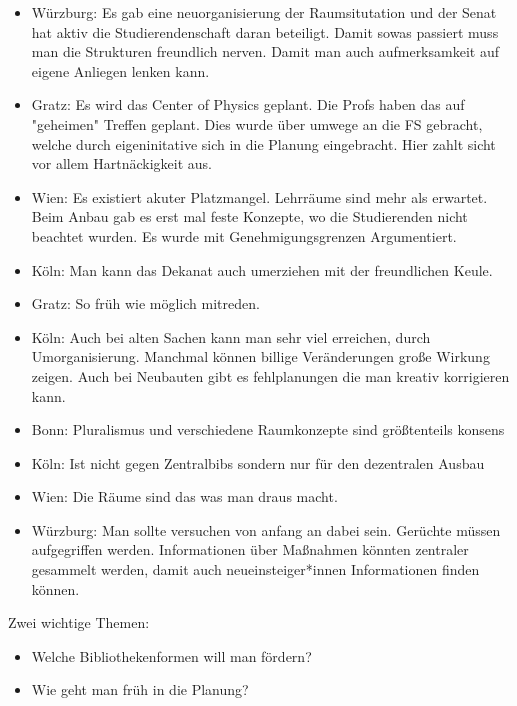 \begin{itemize}
      \item Würzburg: Es gab eine neuorganisierung der Raumsitutation und der Senat hat aktiv die Studierendenschaft daran beteiligt. Damit sowas passiert muss man die Strukturen freundlich nerven. Damit man auch aufmerksamkeit auf eigene Anliegen lenken kann.

      \item Gratz: Es wird das Center of Physics geplant. Die Profs haben das auf "geheimen" Treffen geplant. Dies wurde über umwege an die FS gebracht, welche durch eigeninitative sich in die Planung eingebracht. Hier zahlt sicht vor allem Hartnäckigkeit aus.

      \item Wien: Es existiert akuter Platzmangel. Lehrräume sind mehr als erwartet. Beim Anbau gab es erst mal feste Konzepte, wo die Studierenden nicht beachtet wurden. Es wurde mit Genehmigungsgrenzen Argumentiert.

      \item Köln: Man kann das Dekanat auch umerziehen mit der freundlichen Keule.

      \item Gratz: So früh wie möglich mitreden.

      \item Köln: Auch bei alten Sachen kann man sehr viel erreichen, durch Umorganisierung. Manchmal können billige Veränderungen große Wirkung zeigen. Auch bei Neubauten gibt es fehlplanungen die man kreativ korrigieren kann.

      \item Bonn: Pluralismus und verschiedene Raumkonzepte sind größtenteils konsens

      \item Köln: Ist nicht gegen Zentralbibs sondern nur für den dezentralen Ausbau

      \item Wien: Die Räume sind das was man draus macht.

      \item Würzburg: Man sollte versuchen von anfang an dabei sein. Gerüchte müssen aufgegriffen werden. Informationen über Maßnahmen könnten zentraler gesammelt werden, damit auch neueinsteiger*innen Informationen finden können.
    \end{itemize}

      Zwei wichtige Themen:
      \begin{itemize}
        \item Welche Bibliothekenformen will man fördern?
        \item Wie geht man früh in die Planung?
      \end{itemize}

